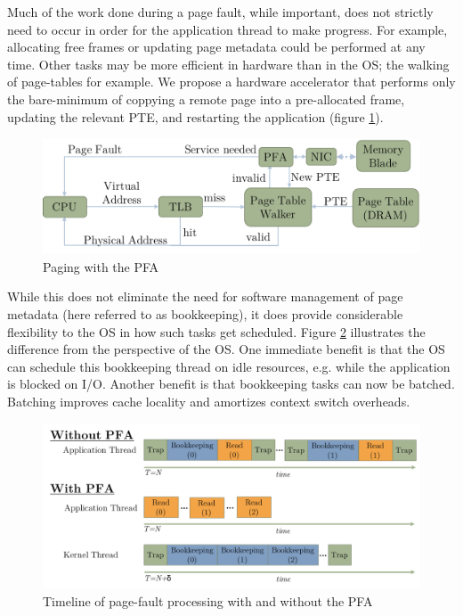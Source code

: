 Much of the work done during a page fault, while important, does not strictly
need to occur in order for the application thread to make progress. For
example, allocating free frames or updating page metadata could be performed at
any time. Other tasks may be more efficient in hardware than in the OS; the
walking of page-tables for example. We propose a hardware accelerator that
performs only the bare-minimum of coppying a remote page into a pre-allocated
frame, updating the relevant PTE, and restarting the application (figure
\ref{fig:pfa_generic}).

\begin{figure}[h]
    \centering
    \includegraphics[width=0.9\columnwidth]{figs/generic_pfa.pdf}
    \vspace{-5mm}
    \caption{Paging with the PFA}
    \label{fig:pfa_generic}
\end{figure}

While this does not eliminate the need for software management of page metadata
(here referred to as \gls{bookkeeping}), it does provide considerable flexibility
to the OS in how such \glspl{task} get scheduled. Figure
\ref{fig:bookkeeping_timeline} illustrates the difference from the perspective
of the OS. One immediate benefit is that the OS can schedule this bookkeeping
thread on idle resources, e.g. while the application is blocked on I/O.
Another benefit is that bookkeeping tasks can now be batched. Batching improves
cache locality and amortizes context switch overheads. 

\begin{figure}[h]
    \centering
    \includegraphics[width=0.9\columnwidth]{figs/bookkeeping_timeline.pdf}
    \vspace{-5mm}
    \caption{Timeline of page-fault processing with and without the PFA}
    \label{fig:bookkeeping_timeline}
\end{figure}

